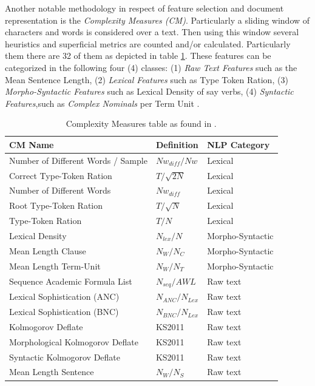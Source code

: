 Another notable methodology in respect of  feature selection and document representation is the \textit{Complexity Measures (CM)}.  Particularly a sliding window of characters and words is considered over a text. Then using this window several heuristics and superficial metrics are counted and/or calculated. Particularly them there are 32 of them as depicted in table \ref{chap:relevant_work:tbl:complexity_measures}. These features can be categorized in the following four (4) classes: (1) \textit{Raw Text Features} such as the Mean Sentence Length, (2) \textit{Lexical Features} such as Type Token Ration, (3) \textit{Morpho-Syntactic Features} such as Lexical Density of say verbs, (4) \textit{Syntactic Features},such as \textit{Complex Nominals} per Term Unit \parencite{strobel2018text}.

\begin{table}[t]
	\center
	\caption {Complexity Measures table as found in \parencite{strobel2018text}.}\label{chap:relevant_work:tbl:complexity_measures}
	\begin{tabular}{lll}
		\hline
		CM Name & Definition & NLP Category \\
		\hline
		Number of Different Words / Sample & $Nw_{diff} / Nw$ & Lexical \\
		Correct Type-Token Ration & $T/\sqrt{2N}$ & Lexical \\
		Number of Different Words & $Nw_{diff}$ & Lexical \\
		Root Type-Token Ration & $T/\sqrt{N}$ & Lexical \\
		Type-Token Ration & $T/N$ & Lexical \\
		Lexical Density & $N_{lex}/N$ & Morpho-Syntactic \\
		Mean Length Clause & $N_{W}/N_{C}$ & Morpho-Syntactic \\
		Mean Length Term-Unit & $N_{W}/N_{T}$ & Morpho-Syntactic \\
		Sequence Academic Formula List & $N_{seq}/AWL$ & Raw text \\
		Lexical Sophistication (ANC) & $N_{ANC}/N_{Lex}$ & Raw text \\
		Lexical Sophistication (BNC) & $N_{BNC}/N_{Lex}$ & Raw text \\
		Kolmogorov Deflate & KS2011 & Raw text \\
		Morphological Kolmogorov Deflate & KS2011 & Raw text \\
		Syntactic Kolmogorov Deflate & KS2011 & Raw text \\
		Mean Length Sentence & $N_{W}/N_{S}$ & Raw text \\

\end{tabular}
\end{table}
